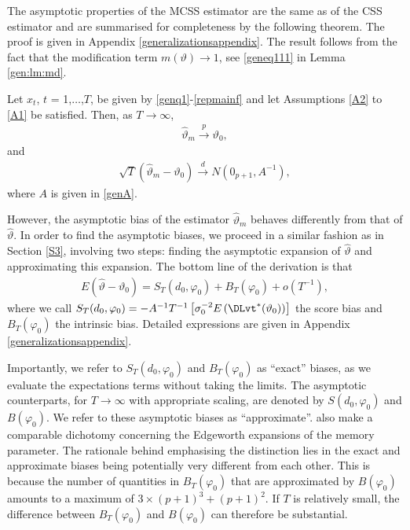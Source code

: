 {{The asymptotic properties of the MCSS estimator are the same as of the CSS estimator and are summarised for completeness by the following theorem. The proof is given in Appendix \ref{generalizationsappendix}. The result follows from the fact that the modification term  $m(\vartheta) \rightarrow 1$, see \eqref{geneq111} in Lemma \ref{gen:lm:md}.
\begin{theorem}\label{t51} 
Let $x_t$, $t$ = 1,$\ldots$,$T$, be given by \eqref{genq1}-\eqref{repmainf} and let Assumptions \ref{A2} to \ref{A1} be satisfied. Then, as $T \rightarrow \infty$, 
\begin{align}
    \hat{\vartheta}_{m} \overset{p}{\rightarrow} \vartheta_0,
\end{align}
and
\begin{align}
    \sqrt{T} (\hat{\vartheta}_{m} - \vartheta_0 ) \xrightarrow{d} N(0_{p+1},A^{-1}), \label{genmcssdis}
\end{align}
where $A$ is given in \eqref{genA}.
\end{theorem} 
However, the asymptotic bias of the estimator $\hat{\vartheta}_{m}$ behaves differently from that of $\hat{\vartheta}$. In order to find the asymptotic biases, we proceed in a similar fashion as in Section \ref{S3}, involving two steps: finding the asymptotic expansion of $\hat{\vartheta}$ and approximating this expansion. The bottom line of the derivation is that 
\begin{align}
    E\left( \hat{\vartheta} - \vartheta_0 \right) = S_T(d_0,\varphi_0) + B_T(\varphi_0) + o(T^{-1}), \label{trian}
\end{align}
where we call $S_T(d_0,\varphi_0) = - A^{-1} T^{-1}\left[ \sigma^{-2}_0 E \left( \DLvt^*(\vartheta_0) \right)  \right]$
the score bias and $B_T(\varphi_0)$ the intrinsic bias. Detailed expressions are given in Appendix \ref{generalizationsappendix}. 

Importantly, we refer to $S_T(d_0,\varphi_0)$ and $B_T(\varphi_0)$ as ``exact'' biases, as we evaluate the expectations terms without taking the limits. The asymptotic counterparts, for $T \rightarrow \infty$ with appropriate scaling,
are denoted by $S(d_0,\varphi_0)$ and $B(\varphi_0)$.  We refer to these asymptotic biases as ``approximate''. \textcite{lieberman2005expansions} also make a comparable dichotomy concerning the Edgeworth expansions of the memory
parameter. The rationale behind emphasising the distinction lies in the exact and approximate biases being potentially very different from each other. This is because the number of quantities in $B_T(\varphi_0)$ that are
approximated by $B(\varphi_0)$ amounts to a maximum of $3\times (p+1)^3 + (p+1)^2$. If $T$ is relatively small, the difference between $B_T(\varphi_0)$ and $B(\varphi_0)$ can therefore be substantial.



}}
